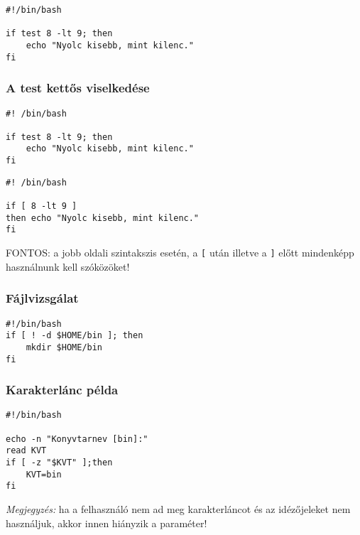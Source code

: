 \begin{lstlisting}[rulecolor=\color{green},rulesepcolor=\color{green}]
 #!/bin/bash

if test 8 -lt 9; then
    echo "Nyolc kisebb, mint kilenc."
fi
\end{lstlisting}

\subsubsection*{A test kettős viselkedése}

\begin{minipage}{0.425\textwidth}
\lstset{linewidth=\textwidth}
\begin{lstlisting}
#! /bin/bash

if test 8 -lt 9; then
    echo "Nyolc kisebb, mint kilenc."
fi
\end{lstlisting}
\end{minipage}
\hspace{1em}
\begin{minipage}{0.425\textwidth}
\lstset{linewidth=\textwidth}
\begin{lstlisting}
#! /bin/bash

if [ 8 -lt 9 ]
then echo "Nyolc kisebb, mint kilenc."
fi
\end{lstlisting}
\end{minipage}

\noindent FONTOS: a jobb oldali szintakszis esetén, a \verb.[. után illetve a \verb.]. előtt mindenképp használnunk kell szóközöket!



\subsubsection*{Fájlvizsgálat}
\begin{lstlisting}
#!/bin/bash
if [ ! -d $HOME/bin ]; then
    mkdir $HOME/bin
fi 
\end{lstlisting}


\subsubsection*{Karakterlánc példa}
\begin{lstlisting}
#!/bin/bash

echo -n "Konyvtarnev [bin]:"
read KVT
if [ -z "$KVT" ];then
    KVT=bin
fi
\end{lstlisting}
\emph{Megjegyzés:} ha a felhasználó nem ad meg karakterláncot és az idézőjeleket nem használjuk, akkor innen
hiányzik a paraméter!


